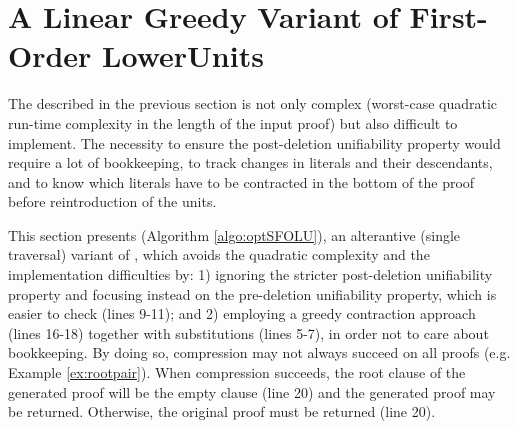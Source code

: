 
\section{A Linear Greedy Variant of First-Order LowerUnits}
\label{sec:SimpleFOLU}

The {\FOLowerUnits} described in the previous section is not only complex (worst-case quadratic run-time complexity in the length of the input proof) but also difficult to implement. The necessity to ensure the post-deletion unifiability property would require a lot of bookkeeping, to track changes in literals and their descendants, and to know which literals have to be contracted in the bottom of the proof before reintroduction of the units. 

This section presents {\SFOLowerUnits} (Algorithm \ref{algo:optSFOLU}), an alterantive (single traversal) variant of {\FOLowerUnits}, which avoids the quadratic complexity and the implementation difficulties by: 1) ignoring the stricter post-deletion unifiability property and focusing instead on the pre-deletion unifiability property, which is easier to check (lines 9-11); and 2) employing a greedy contraction approach (lines 16-18) together with substitutions (lines 5-7), in order not to care about bookkeeping. By doing so, compression may not always succeed on all proofs (e.g. Example \ref{ex:rootpair}). When compression succeeds, the root clause of the generated proof will be the empty clause (line 20) and the generated proof may be returned. Otherwise, the original proof must be returned (line 20).

\newlength\algowd
\def\savewd#1{\setbox0=\hbox{#1\hspace{.7in}}\algowd=\wd0\relax#1}
\newcommand\algolines[2]{\savewd{#1}%
  \tcp*{\parbox[t]{\dimexpr\algowidth-\algowd}{#2}}}
  

